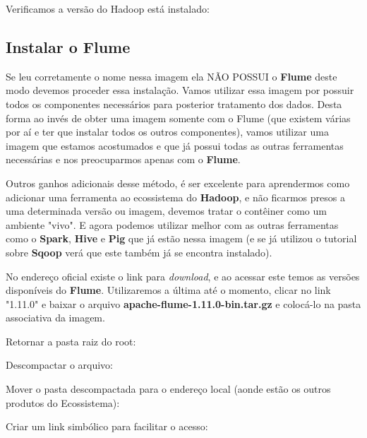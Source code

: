 \documentclass[a4paper,11pt]{article}
\begin{document}


Verificamos a versão do Hadoop está instalado: \\

\subsection{Instalar o Flume}
Se leu corretamente o nome nessa imagem ela NÃO POSSUI o \textbf{Flume} deste modo devemos proceder essa instalação. Vamos utilizar essa imagem por possuir todos os componentes necessários para posterior tratamento dos dados. Desta forma ao invés de obter uma imagem somente com o Flume (que existem várias por aí e ter que instalar todos os outros componentes), vamos utilizar uma imagem que estamos acostumados e que já possui todas as outras ferramentas necessárias e nos preocuparmos apenas com o \textbf{Flume}.

Outros ganhos adicionais desse método, é ser excelente para aprendermos como adicionar uma ferramenta ao ecossistema do \textbf{Hadoop}, e não ficarmos presos a uma determinada versão ou imagem, devemos tratar o contêiner como um ambiente "vivo". E agora podemos utilizar melhor com as outras ferramentas como o \textbf{Spark}, \textbf{Hive} e \textbf{Pig} que já estão nessa imagem (e se já utilizou o tutorial sobre \textbf{Sqoop} verá que este também já se encontra instalado).

No endereço oficial \cite{flumeoficial} existe o link para \textit{download}, e ao acessar este temos as versões disponíveis do \textbf{Flume}. Utilizaremos a última até o momento, clicar no link "1.11.0" e baixar o arquivo \textbf{apache-flume-1.11.0-bin.tar.gz} e colocá-lo na pasta associativa da imagem.

Retornar a pasta raiz do root: \\

Descompactar o arquivo: \\

Mover o pasta descompactada para o endereço local (aonde estão os outros produtos do Ecossistema): \\

Criar um link simbólico para facilitar o acesso: \\
 \\
\end{document}
